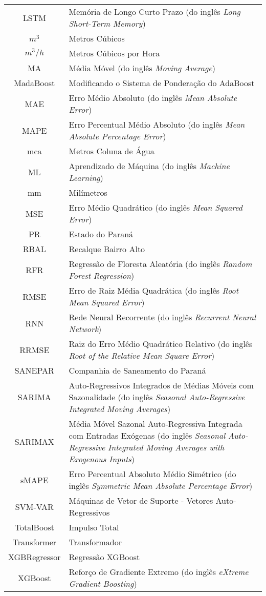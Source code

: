 \begin{tabular}{cp{}}
	LSTM & Memória de Longo Curto Prazo (do inglês \textit{Long Short-Term Memory})	\\
	$m^3$ & Metros Cúbicos\\
	$m^3/h$ & Metros Cúbicos por Hora\\
	MA & Média Móvel (do inglês \textit{Moving Average})\\
	MadaBoost & Modificando o Sistema de Ponderação do AdaBoost\\
	MAE & Erro Médio Absoluto (do inglês \textit{Mean Absolute Error})\\
	MAPE & Erro Percentual Médio Absoluto (do inglês \textit{Mean Absolute Percentage Error})\\
	mca & Metros Coluna de Água\\
	ML & Aprendizado de Máquina (do inglês \textit{Machine Learning})\\
	mm & Milímetros\\
	MSE & Erro Médio Quadrático (do inglês \textit{Mean Squared Error})\\
	PR & Estado do Paraná\\
	RBAL & Recalque Bairro Alto\\
	RFR & Regressão de Floresta Aleatória (do inglês \textit{Random Forest Regression})\\
	RMSE & Erro de Raiz Média Quadrática (do inglês \textit{Root Mean Squared Error})\\
	RNN & Rede Neural Recorrente (do inglês \textit{Recurrent Neural Network})\\
	RRMSE & Raiz do Erro Médio Quadrático Relativo (do inglês \textit{Root of the Relative Mean Square Error})\\
	SANEPAR & Companhia de Saneamento do Paraná \\
	SARIMA & Auto-Regressivos Integrados de Médias Móveis com Sazonalidade (do inglês \textit{Seasonal Auto-Regressive Integrated Moving Averages}) \\
	SARIMAX & Média Móvel Sazonal Auto-Regressiva Integrada com Entradas Exógenas (do inglês \textit{Seasonal Auto-Regressive Integrated Moving Averages with Exogenous Inputs}) \\
	sMAPE &  Erro Percentual Absoluto Médio Simétrico (do inglês \textit{Symmetric Mean Absolute Percentage Error})\\
	SVM-VAR & Máquinas de Vetor de Suporte - Vetores Auto-Regressivos\\
	TotalBoost & Impulso Total\\
	Transformer & Transformador \\
	XGBRegressor & Regressão XGBoost\\
	XGBoost & Reforço de Gradiente Extremo (do inglês \textit{eXtreme Gradient Boosting})
\end{tabular}
